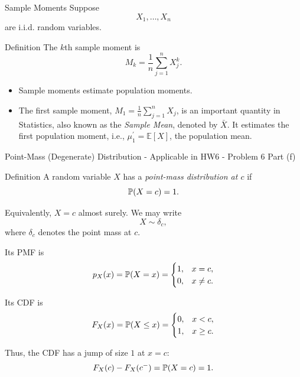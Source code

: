 




























\begin{frame}{Sample Moments}
Suppose
\[
X_1,\dots,X_n
\]
are i.i.d. random variables.

\begin{keybox}{Definition}
The $k$th sample moment is
\[
M_k
=
\frac1n
\sum_{j=1}^n X_j^k.
\]
\end{keybox}


\begin{itemize}
    \item Sample moments estimate population moments.
    \item The first sample moment, $M_1 = \frac1n
\sum_{j=1}^n X_j$, is an important quantity in Statistics, also known as the \textit{Sample Mean}, denoted by $\bar X$. It estimates the first population moment, i.e., $\mu^\prime_1=\mathbb{E}[X]$, the population mean.
\end{itemize}
\end{frame}




\begin{frame}{Point-Mass (Degenerate) Distribution - Applicable in HW6 - Problem 6 Part (f)}

\small

\begin{keybox}{Definition}
A random variable \(X\) has a \emph{point-mass distribution at \(c\)} if
\[
\mathbb{P}(X=c)=1.
\]

Equivalently, \(X=c\) almost surely. We may write
\[
X\sim\delta_c,
\]
where \(\delta_c\) denotes the point mass at \(c\).
\end{keybox}

Its PMF is
\[
p_X(x)=\mathbb{P}(X=x)
=
\begin{cases}
1, & x=c,\\
0, & x\neq c.
\end{cases}
\]

Its CDF is
\[
F_X(x)=\mathbb{P}(X\leq x)
=
\begin{cases}
0, & x<c,\\
1, & x\geq c.
\end{cases}
\]

Thus, the CDF has a jump of size \(1\) at \(x=c\):
\[
F_X(c)-F_X(c^-)=\mathbb{P}(X=c)=1.
\]


\end{frame}



